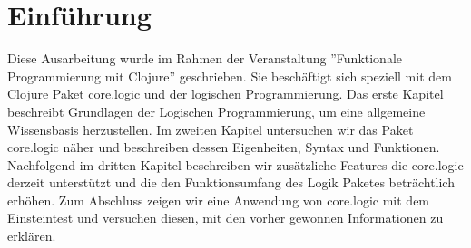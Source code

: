 \section{Einführung}
Diese Ausarbeitung wurde im Rahmen der Veranstaltung ''Funktionale Programmierung mit Clojure'' geschrieben. Sie beschäftigt sich speziell mit dem Clojure Paket core.logic und der logischen Programmierung. Das erste Kapitel beschreibt Grundlagen der Logischen Programmierung, um eine allgemeine Wissensbasis herzustellen. Im zweiten Kapitel untersuchen wir das Paket core.logic näher und beschreiben dessen Eigenheiten, Syntax und Funktionen.
Nachfolgend im dritten Kapitel beschreiben wir zusätzliche Features die core.logic derzeit unterstützt und die den Funktionsumfang des Logik Paketes beträchtlich erhöhen.
Zum Abschluss zeigen wir eine Anwendung von core.logic mit dem Einsteintest und versuchen diesen, mit den vorher gewonnen Informationen zu erklären.
